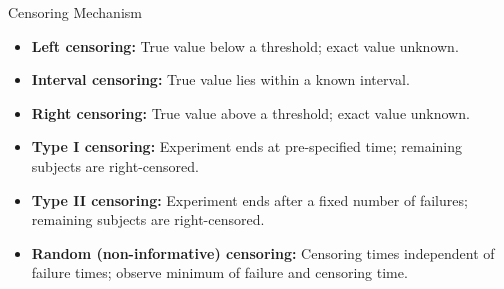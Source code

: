 \documentclass[11pt,compress,t,notes=noshow, xcolor=table]{beamer}
\begin{document}

\begin{frame}{Censoring Mechanism}
\small
\begin{itemize}
    \item \textbf{Left censoring:} True value below a threshold; exact value unknown.
    \item \textbf{Interval censoring:} True value lies within a known interval.
    \item \textbf{Right censoring:} True value above a threshold; exact value unknown.
    \pause
    \item \textbf{Type I censoring:} Experiment ends at pre-specified time; remaining subjects are right-censored.
    \item \textbf{Type II censoring:} Experiment ends after a fixed number of failures; remaining subjects are right-censored.
    \item \textbf{Random (non-informative) censoring:} Censoring times independent of failure times; observe minimum of failure and censoring time.
\end{itemize}
\end{frame}
\end{document}
